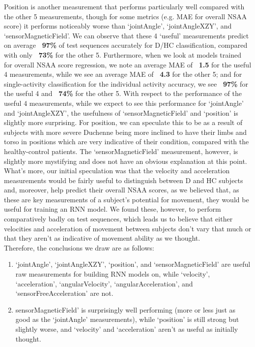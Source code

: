 \documentclass[12pt,twoside]{report}
\begin{document}
\quad Position is another measurement that performs particularly well compared with the other 5 measurements, though for some metrics (e.g. MAE for overall NSAA score) it performs noticeably worse than ‘jointAngle’, ‘jointAngleXZY’, and ‘sensorMagneticField’. We can observe that these 4 ‘useful’ measurements predict on average \textbf{~97\%} of test sequences accurately for D/HC classification, compared with only \textbf{~73\%} for the other 5. Furthermore, when we look at models trained for overall NSAA score regression, we note an average MAE of \textbf{~1.5} for the useful 4 measurements, while we see an average MAE of \textbf{~4.3} for the other 5; and for single-activity classification for the individual activity accuracy, we see \textbf{~97\%} for the useful 4 and \textbf{~74\%} for the other 5. With respect to the performance of the useful 4 measurements, while we expect to see this performance for ‘jointAngle’ and ‘jointAngleXZY’, the usefulness of ‘sensorMagneticField’ and ‘position’ is slightly more surprising. For position, we can speculate this to be as a result of subjects with more severe Duchenne being more inclined to have their limbs and torso in positions which are very indicative of their condition, compared with the healthy-control patients. The ‘sensorMagneticField’ measurement, however, is slightly more mystifying and does not have an obvious explanation at this point. What’s more, our initial speculation was that the velocity and acceleration measurements would be fairly useful to distinguish between D and HC subjects and, moreover, help predict their overall NSAA scores, as we believed that, as these are key measurements of a subject’s potential for movement, they would be useful for training an RNN model. We found these, however, to perform comparatively badly on test sequences, which leads us to believe that either velocities and acceleration of movement between subjects don’t vary that much or that they aren’t as indicative of movement ability as we thought.\\

\quad Therefore, the conclusions we draw are as follows:

\begin{enumerate}
	\item ‘jointAngle’, ‘jointAngleXZY’, ‘position’, and ‘sensorMagneticField’ are useful raw measurements for building RNN models on, while ‘velocity’, ‘acceleration’, ‘angularVelocity’, ‘angularAcceleration’, and ‘sensorFreeAcceleration’ are not.
	\item sensorMagneticField’ is surprisingly well performing (more or less just as good as the ‘jointAngle’ measurements), while ‘position’ is still strong but slightly worse, and ‘velocity’ and ‘acceleration’ aren’t as useful as initially thought.
\end{enumerate}
\end{document}
